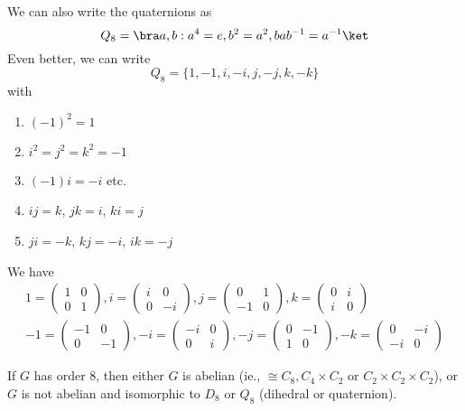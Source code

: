 \documentclass[a4paper]{article}
\begin{document}
\begin{notation}
  We can also write the quaternions as
  \[
    Q_8 = \bra a, b : a^4 = e, b^2 = a^2, bab^{-1} = a^{-1}\ket
  \]
  Even better, we can write
  \[
    Q_8 = \{1, -1, i, -i, j, -j, k, -k\}
  \]
  with
  \begin{enumerate}
    \item $(-1)^2 = 1$
    \item $i^2 = j^2 = k^2 = -1$
    \item $(-1)i = -i$ etc.
    \item $ij = k$, $jk = i$, $ki = j$
    \item $ji = -k$, $kj = -i$, $ik = -j$
  \end{enumerate}
  We have
  \begin{gather*}
    1 = \begin{pmatrix}
      1&0\\0&1
    \end{pmatrix},
    i = \begin{pmatrix}
      i & 0\\0&-i
    \end{pmatrix},
    j = \begin{pmatrix}
      0&1\\-1&0
    \end{pmatrix},
    k = \begin{pmatrix}
      0&i\\i&0
    \end{pmatrix}\\
    -1 = \begin{pmatrix}
      -1&0\\0&-1
    \end{pmatrix},
    -i = \begin{pmatrix}
      -i & 0\\0&i
    \end{pmatrix},
    -j = \begin{pmatrix}
      0&-1\\1&0
    \end{pmatrix},
    -k = \begin{pmatrix}
      0&-i\\-i&0
    \end{pmatrix}
  \end{gather*}
\end{notation}

\begin{lemma}
  If $G$ has order 8, then either $G$ is abelian (ie., $\cong C_8, C_4\times C_2$ or $C_2\times C_2\times C_2$), or $G$ is not abelian and isomorphic to $D_8$ or $Q_8$ (dihedral or quaternion).
\end{lemma}
\end{document}
